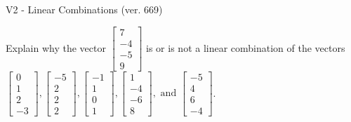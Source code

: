 \begin{exercise}
  \begin{exerciseTitle}V2 - Linear Combinations (ver. 669)\end{exerciseTitle}
  \begin{exerciseStatement}
    Explain why the vector \(\left[\begin{array}{c}
7 \\
-4 \\
-5 \\
9
\end{array}\right]\)  is or is not a linear 
	combination of the vectors \(\left[\begin{array}{c}
0 \\
1 \\
2 \\
-3
\end{array}\right] , \left[\begin{array}{c}
-5 \\
2 \\
2 \\
2
\end{array}\right] , \left[\begin{array}{c}
-1 \\
1 \\
0 \\
1
\end{array}\right] , \left[\begin{array}{c}
1 \\
-4 \\
-6 \\
8
\end{array}\right] , \text{ and } \left[\begin{array}{c}
-5 \\
4 \\
6 \\
-4
\end{array}\right]\).
	



\end{exerciseStatement}
\end{exercise}
